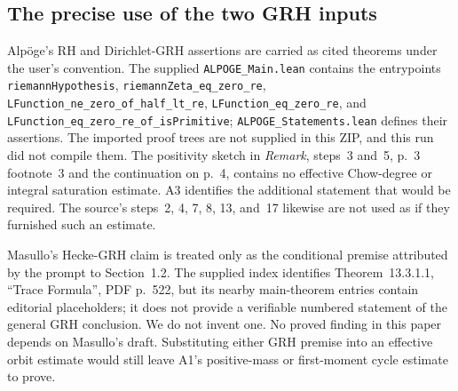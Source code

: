 \subsection*{The precise use of the two GRH inputs}
Alp\"oge's RH and Dirichlet-GRH assertions are carried as cited theorems under the user's convention. The supplied \texttt{ALPOGE\_Main.lean} contains the entrypoints \texttt{riemannHypothesis}, \texttt{riemannZeta\_eq\_zero\_re}, \texttt{LFunction\_ne\_zero\_of\_half\_lt\_re}, \texttt{LFunction\_eq\_zero\_re}, and \texttt{LFunction\_eq\_zero\_re\_of\_isPrimitive}; \texttt{ALPOGE\_Statements.lean} defines their assertions. The imported proof trees are not supplied in this ZIP, and this run did not compile them. The positivity sketch in \emph{Remark}, steps~3 and~5, p.~3 footnote~3 and the continuation on p.~4, contains no effective Chow-degree or integral saturation estimate. A3 identifies the additional statement that would be required. The source's steps~2, 4, 7, 8, 13, and~17 likewise are not used as if they furnished such an estimate.

Masullo's Hecke-GRH claim is treated only as the conditional premise attributed by the prompt to Section~1.2. The supplied index identifies Theorem~13.3.1.1, ``Trace Formula'', PDF p.~522, but its nearby main-theorem entries contain editorial placeholders; it does not provide a verifiable numbered statement of the general GRH conclusion. We do not invent one. No proved finding in this paper depends on Masullo's draft. Substituting either GRH premise into an effective orbit estimate would still leave A1's positive-mass or first-moment cycle estimate to prove.




